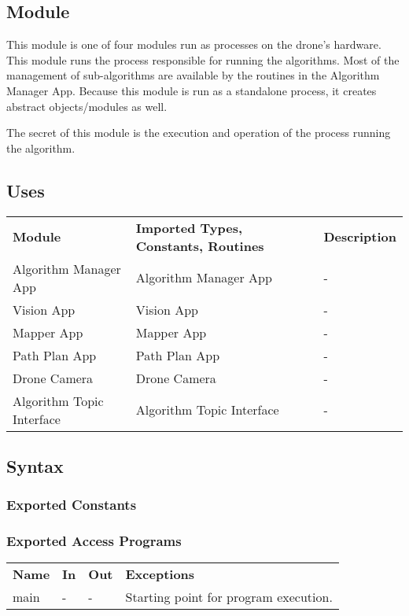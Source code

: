 \documentclass[12pt, titlepage]{article}
\begin{document}
\subsection{Module}
This module is one of four modules run as processes on the drone's hardware. This module runs the process responsible for running the algorithms. Most of the management of sub-algorithms are available by the routines in the Algorithm Manager App. Because this module is run as a standalone process, it creates abstract objects/modules as well.

The secret of this module is the execution and operation of the process running the algorithm.   
\subsection{Uses}
\begin{center}
\begin{tabular}{p{2 cm} p{5cm} p{6.5cm} } 
\hline
\textbf{Module} & \textbf{Imported Types, Constants, Routines} & \textbf{Description} \\
Algorithm Manager App & Algorithm Manager App & - \\
Vision App & Vision App & - \\
Mapper App & Mapper App & - \\
Path Plan App & Path Plan App & - \\
Drone Camera & Drone Camera & - \\
Algorithm Topic Interface & Algorithm Topic Interface & - \\
\hline
\hline
\end{tabular}
\end{center}
\subsection{Syntax}
\subsubsection{Exported Constants}
\subsubsection{Exported Access Programs}
\begin{center}
\begin{tabular}{p{3.5cm} p{2.5cm} p{2.5cm} p{5cm}}
\hline
\textbf{Name} & \textbf{In} & \textbf{Out} & \textbf{Exceptions} \\
main & - & - & Starting point for program execution. \\
\hline
\hline
\end{tabular}
\end{center}
\end{document}
